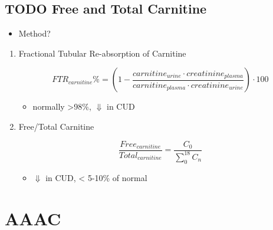 \documentclass{scrartcl}
\begin{document}
\subsection{{\bfseries\sffamily TODO} Free and Total Carnitine}
\label{sec:orgb2292c1}
\begin{itemize}
\item Method?
\end{itemize}
\begin{enumerate}
\item Fractional Tubular Re-absorption of Carnitine
\label{sec:orgae1e4b8}

\begin{equation*}
FTR_{carnitine}\% = \left( 1 -  \frac{carnitine_{urine} \cdot creatinine_{plasma}}{carnitine_{plasma} \cdot creatinine_{urine}}\right) \cdot 100
\end{equation*}

\begin{itemize}
\item normally >98\%, \(\Downarrow\) in CUD
\end{itemize}

\item Free/Total Carnitine
\label{sec:org64f60b9}

\[
\frac{Free_{carnitine}}{Total_{carnitine}} = \frac{C_0}{\sum_{0}^{18} C_n}
\]

\begin{itemize}
\item \(\Downarrow\) in CUD, < 5-10\% of normal
\end{itemize}
\end{enumerate}
\section{AAAC}
\label{sec:org5830cac}
\end{document}
